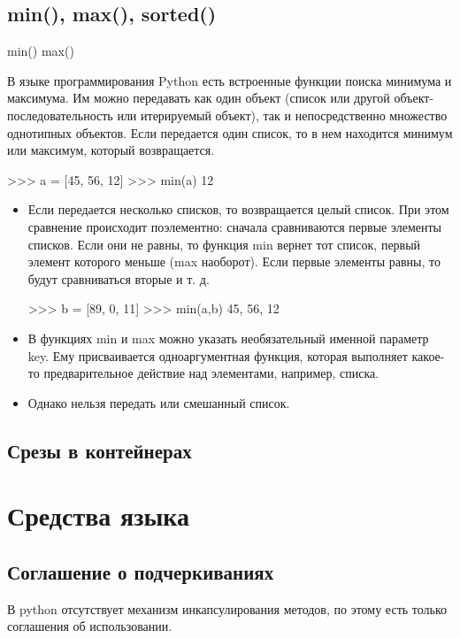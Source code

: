 \subsection{min(), max(), sorted()}

	min() max()

		В языке программирования Python есть встроенные функции поиска минимума и максимума. Им можно передавать как один объект (список или другой объект-последовательность или итерируемый объект), так и непосредственно множество однотипных объектов. Если передается один список, то в нем находится минимум или максимум, который возвращается.
	\begin{python}
		>>> a = [45, 56, 12] 
		>>> min(a) 
		12 
	\end{python}
	\begin{itemize}
			
		\item Если передается несколько списков, то возвращается целый список. При этом сравнение происходит поэлементно: сначала сравниваются первые элементы списков. Если они не равны, то функция min вернет тот список, первый элемент которого меньше (max наоборот). Если первые элементы равны, то будут сравниваться вторые и т. д.
		\begin{python}
>>> b = [89, 0, 11] 
>>> min(a,b) 
45, 56, 12
		\end{python}
		\item В функциях min и max можно указать необязательный именной параметр key. Ему присваивается одноаргументная функция, которая выполняет какое-то предварительное действие над элементами, например, списка.
		\item Однако нельзя передать или смешанный список.	
	\end{itemize}

\subsection{Срезы в контейнерах}

\section{Средства языка}

\subsection{Соглашение о подчеркиваниях}

В python отсутствует механизм инкапсулирования методов, по этому есть только соглашения об использовании.


